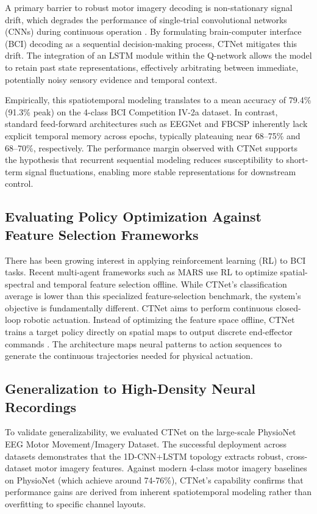 \documentclass[12pt, a4paper]{article}
\begin{document}
A primary barrier to robust motor imagery decoding is non-stationary signal drift, which degrades the performance of single-trial convolutional networks (CNNs) during continuous operation \cite{hameed2025enhancing, prev_student2024}. By formulating brain-computer interface (BCI) decoding as a sequential decision-making process, CTNet mitigates this drift. The integration of an LSTM module within the Q-network allows the model to retain past state representations, effectively arbitrating between immediate, potentially noisy sensory evidence and temporal context.

Empirically, this spatiotemporal modeling translates to a mean accuracy of 79.4\% (91.3\% peak) on the 4-class BCI Competition IV-2a dataset. In contrast, standard feed-forward architectures such as EEGNet and FBCSP inherently lack explicit temporal memory across epochs, typically plateauing near 68--75\% and 68--70\%, respectively. The performance margin observed with CTNet supports the hypothesis that recurrent sequential modeling reduces susceptibility to short-term signal fluctuations, enabling more stable representations for downstream control.

\subsection{Evaluating Policy Optimization Against Feature Selection Frameworks}

There has been growing interest in applying reinforcement learning (RL) to BCI tasks. Recent multi-agent frameworks such as MARS \cite{shin2024mars} use RL to optimize spatial-spectral and temporal feature selection offline. While CTNet's classification average is lower than this specialized feature-selection benchmark, the system's objective is fundamentally different. CTNet aims to perform continuous closed-loop robotic actuation. Instead of optimizing the feature space offline, CTNet trains a target policy directly on spatial maps to output discrete end-effector commands \cite{nallani2024rleegnet}. The architecture maps neural patterns to action sequences to generate the continuous trajectories needed for physical actuation.

\subsection{Generalization to High-Density Neural Recordings}

To validate generalizability, we evaluated CTNet on the large-scale PhysioNet EEG Motor Movement/Imagery Dataset. The successful deployment across datasets demonstrates that the 1D-CNN+LSTM topology extracts robust, cross-dataset motor imagery features. Against modern 4-class motor imagery baselines on PhysioNet (which achieve around 74-76\%), CTNet's capability confirms that performance gains are derived from inherent spatiotemporal modeling rather than overfitting to specific channel layouts.
\end{document}
